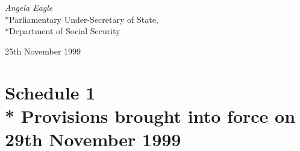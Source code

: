 \documentclass[12pt,a4paper]{article}
\begin{document}
{\raggedleft
\emph{Angela Eagle
}\\*Parliamentary Under-Secretary of State,\\*Department of Social Security

}

25th November 1999

\small

\bigskip

\part[Schedule 1 --- Provisions brought into force on 29th November 1999]{Schedule 1\\* Provisions brought into force on 29th November 1999}

\renewcommand\parthead{--- Schedule 1}
\end{document}
